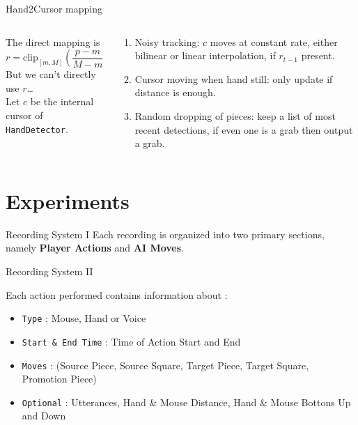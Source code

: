 \documentclass[english]{beamer}
\begin{document}
\begin{frame}{Hand2Cursor mapping}
    \begin{columns}
        \begin{column}{.5\textwidth}
            The direct mapping is
            \begin{equation}
                r = \mathrm{clip}_{[m,M]}(\frac{p - m}{M - m}).
            \end{equation}
            But we can't directly use $r$\dots\\
            Let $c$ be the internal cursor of \texttt{HandDetector}.
        \end{column}
        \begin{column}{.5\textwidth}
            \begin{enumerate}
                \item Noisy tracking: $c$ moves at constant rate, either bilinear or linear interpolation, if $r_{t-1}$ present.
                \item Cursor moving when hand still: only update if distance is enough.
                \item Random dropping of pieces: keep a list of most recent detections, if even one is a grab then output a grab.
            \end{enumerate}
        \end{column}
    \end{columns}
\end{frame}


\section{Experiments}
\begin{frame}{Recording System I}
    Each recording is organized into two primary sections, namely \textbf{Player Actions} and \textbf{AI Moves}. \\
\end{frame}

\begin{frame}{Recording System II}
    
    Each action performed contains information about :   
    \begin{itemize}
            \item \texttt{Type} : Mouse, Hand or Voice
            \item \texttt{Start \& End Time} : Time of Action Start and End 
            \item \texttt{Moves} :  (Source Piece, Source Square, Target Piece, Target Square, Promotion Piece)
            \item \texttt{Optional} : Utterances, Hand \& Mouse Distance, Hand \& Mouse Bottons Up and Down 
    \end{itemize}
\end{frame}
\end{document}
